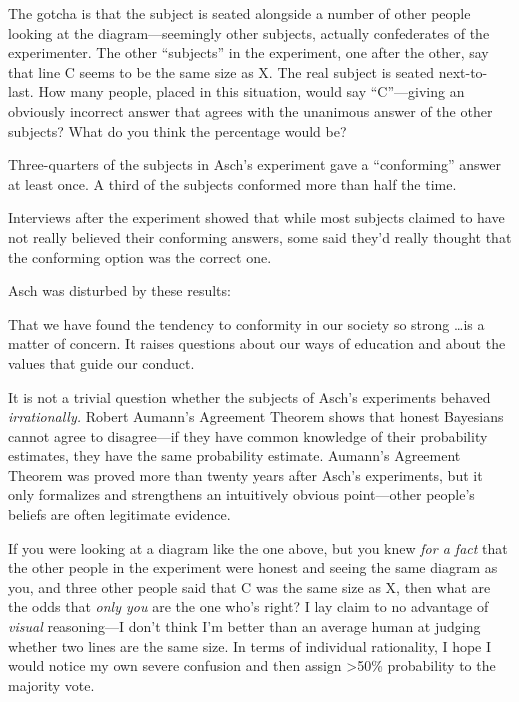 {
 The gotcha is that the subject is seated alongside a number of
other people looking at the diagram---seemingly other subjects,
actually confederates of the experimenter. The other
``subjects'' in the experiment, one
after the other, say that line C seems to be the same size as X. The
real subject is seated next-to-last. How many people, placed in this
situation, would say ``C''---giving
an obviously incorrect answer that agrees with the unanimous answer of
the other subjects? What do you think the percentage would be?}

{
 Three-quarters of the subjects in Asch's
experiment gave a ``conforming''
answer at least once. A third of the subjects conformed more than half
the time.}

{
 Interviews after the experiment showed that while most subjects
claimed to have not really believed their conforming answers, some said
they'd really thought that the conforming option was
the correct one.}

{
 Asch was disturbed by these results:}

{
 That we have found the tendency to conformity in our society so
strong \ldots is a matter of concern. It raises questions about our ways
of education and about the values that guide our
conduct.}

{
 It is not a trivial question whether the subjects of
Asch's experiments behaved \textit{irrationally.}
Robert Aumann's Agreement Theorem shows that honest
Bayesians cannot agree to disagree---if they have common knowledge of
their probability estimates, they have the same probability estimate.
Aumann's Agreement Theorem was proved more than twenty
years after Asch's experiments, but it only formalizes
and strengthens an intuitively obvious point---other
people's beliefs are often legitimate evidence.}

{
 If you were looking at a diagram like the one above, but you knew
\textit{for a fact} that the other people in the experiment were honest
and seeing the same diagram as you, and three other people said that C
was the same size as X, then what are the odds that \textit{only you}
are the one who's right? I lay claim to no advantage of
\textit{visual} reasoning---I don't think
I'm better than an average human at judging whether two
lines are the same size. In terms of individual rationality, I hope I
would notice my own severe confusion and then assign {\textgreater}50\%
probability to the majority vote.}

